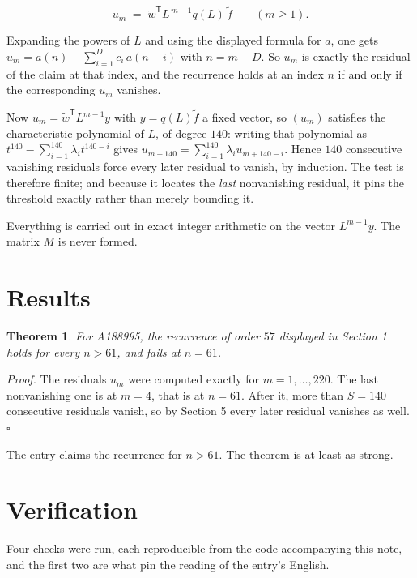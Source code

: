 \documentclass[11pt]{article}
\newtheorem{theorem}{Theorem}
\theoremstyle{definition}
\begin{document}
\[u_m \;=\; \tilde w^{\mathsf T} L^{\,m-1} q(L)\,\tilde f \qquad (m \ge 1).\]

Expanding the powers of $L$ and using the displayed formula for $a$, one gets $u_m = a(n) - \sum_{i=1}^{D} c_i\,a(n-i)$ with $n = m + D$. So $u_m$ is exactly the residual of the claim at that index, and the recurrence holds at an index $n$ if and only if the corresponding $u_m$ vanishes.

Now $u_m = \tilde w^{\mathsf T} L^{m-1} y$ with $y = q(L)\tilde f$ a fixed vector, so $(u_m)$ satisfies the characteristic polynomial of $L$, of degree $140$: writing that polynomial as $t^{140} - \sum_{i=1}^{140} \lambda_i t^{140-i}$ gives $u_{m+140} = \sum_{i=1}^{140} \lambda_i u_{m+140-i}$. Hence $140$ consecutive vanishing residuals force every later residual to vanish, by induction. The test is therefore finite; and because it locates the {\itshape last} nonvanishing residual, it pins the threshold exactly rather than merely bounding it.

Everything is carried out in exact integer arithmetic on the vector $L^{m-1}y$. The matrix $M$ is never formed.

\section{Results}

\begin{theorem} For A188995, the recurrence of order $57$ displayed in Section 1 holds for every $n > 61$, and fails at $n = 61$.\end{theorem}

{\itshape Proof.} The residuals $u_m$ were computed exactly for $m = 1,\dots,220$. The last nonvanishing one is at $m = 4$, that is at $n = 61$. After it, more than $S = 140$ consecutive residuals vanish, so by Section 5 every later residual vanishes as well. $\square$

The entry claims the recurrence for $n > 61$. The theorem is at least as strong.

\section{Verification}

Four checks were run, each reproducible from the code accompanying this note, and the first two are what pin the reading of the entry's English.
\end{document}
